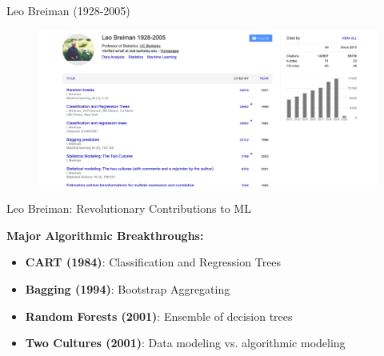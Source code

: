 \documentclass[usenames,dvipsnames]{beamer}
\begin{document}
\begin{frame}{Leo Breiman (1928-2005)}
\begin{center}
\begin{figure}
	\centering
	\includegraphics[width=0.7\linewidth]{../assets/decision-trees/diagrams/brieman}
	\label{fig:brieman}
\end{figure}
\end{center}
\end{frame}

\begin{frame}{Leo Breiman: Revolutionary Contributions to ML}
\begin{keypointsbox}
\textbf{Major Algorithmic Breakthroughs:}
\begin{itemize}
\item \textbf{CART (1984)}: Classification and Regression Trees
\item \textbf{Bagging (1994)}: Bootstrap Aggregating
\item \textbf{Random Forests (2001)}: Ensemble of decision trees
\item \textbf{Two Cultures (2001)}: Data modeling vs. algorithmic modeling
\end{itemize}
\end{keypointsbox}
\end{frame}
\end{document}
